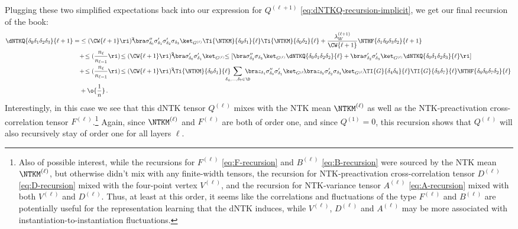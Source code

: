 Plugging these two simplified expectations back into our expression for  $Q^{(\ell+1)}$ \eqref{eq:dNTKQ-recursion-implicit}, we get our final recursion of the book:
\begin{align}
\dNTKQ{\delta_0\delta_1\delta_2\delta_3}{\ell+1}=&\le(\CW{\ell+1}\ri)^2\!\!\bra\sigma^{\prime\prime}_{\delta_0}\sigma^{\prime}_{\delta_1}\sigma^{\prime}_{\delta_2}\sigma_{\delta_3} \ket_{G^{(\ell)}}\Ti{\NTKM}{\delta_0\delta_1}{\ell}\Ti{\NTKM}{\delta_0\delta_2}{\ell}+\frac{\lambda_{W}^{(\ell+1)}}{\CW{\ell+1}}\NTHF{\delta_1\delta_0\delta_3\delta_2}{\ell+1}\, \label{eq:dNTKQ-recursion-explicit} \notag \\
&+\!\le(\frac{n_{\ell}}{n_{\ell-1}}\ri)\!\le(\CW{\ell+1}\ri)^2\!\!\bra\sigma^{\prime}_{\delta_0}\sigma^{\prime}_{\delta_1}\ket_{G^{(\ell)}}\!\!\le[\bra\sigma^{\prime\prime}_{\delta_2}\sigma_{\delta_3}\ket_{G^{(\ell)}}\dNTKQ{\delta_0\delta_1\delta_2\delta_2}{\ell}+\bra\sigma^{\prime}_{\delta_2}\sigma^{\prime}_{\delta_3}\ket_{G^{(\ell)}}\dNTKQ{\delta_0\delta_1\delta_2\delta_3}{\ell}\ri]\, \notag\\
&+\!\le(\frac{n_{\ell}}{n_{\ell-1}}\ri)\!\le(\CW{\ell+1}\ri)^2 \!\!\Ti{\NTKM}{\delta_0\delta_1}{\ell}\!\!\!\!\!\!\sum_{\delta_4,\ldots,\delta_7\in\D}\!\! \!\!\!\!\bra z_{\delta_4}\sigma^{\prime\prime}_{\delta_0}\sigma^{\prime}_{\delta_1} \ket_{G^{(\ell)}}\!\!\bra z_{\delta_5}\sigma^{\prime}_{\delta_2}\sigma_{\delta_3} \ket_{G^{(\ell)}}\!\TI{G}{\delta_4\delta_6}{\ell}\TI{G}{\delta_5\delta_7}{\ell}\NTHF{\delta_6\delta_0\delta_7\delta_2}{\ell} \,\notag  \\
&+\o{\frac{1}{n}}\, . 
\end{align}
Interestingly, in this case we see that this dNTK tensor $Q^{(\ell)}$ mixes with the NTK mean $\NTKM^{(\ell)}$ as well as the NTK-preactivation cross-correlation tensor $F^{(\ell)}$.\footnote{Also of possible interest, while the recursions for $F^{(\ell)}$ \eqref{eq:F-recursion} and $B^{(\ell)}$ \eqref{eq:B-recursion} were sourced by the NTK mean $\NTKM^{(\ell)}$, but otherwise didn't mix with any finite-width tensors, the recursion for  NTK-preactivation cross-correlation tensor $D^{(\ell)}$ \eqref{eq:D-recursion} mixed with the four-point vertex $V^{(\ell)}$, and the recursion for NTK-variance tensor $A^{(\ell)}$ \eqref{eq:A-recursion} mixed with both $V^{(\ell)}$ and $D^{(\ell)}$. Thus, at least at this order, it seems like the correlations and fluctuations of the type $F^{(\ell)}$ and $B^{(\ell)}$ are potentially useful for the representation learning that the dNTK induces, while $V^{(\ell)}$, $D^{(\ell)}$ and $A^{(\ell)}$ may be more associated with instantiation-to-instantiation fluctuations.}
Again, since $\NTKM^{(\ell)}$ and $F^{(\ell)}$ are both of order one, and since $Q^{(1)}=0$, this recursion shows that $Q^{(\ell)}$ will also recursively stay of order one for all layers $\ell$.\\






